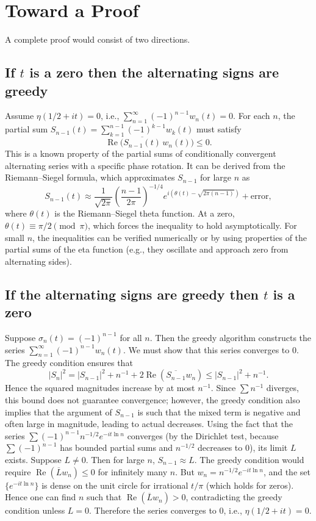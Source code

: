 \documentclass[12pt,a4paper]{article}
\begin{document}
\section{Toward a Proof}

A complete proof would consist of two directions.

\subsection{If $t$ is a zero then the alternating signs are greedy}
Assume $\eta(1/2+it)=0$, i.e., $\sum_{n=1}^{\infty}(-1)^{n-1}w_n(t)=0$. For each $n$, the partial sum $S_{n-1}(t)=\sum_{k=1}^{n-1}(-1)^{k-1}w_k(t)$ must satisfy
\[
\operatorname{Re}\bigl(\overline{S_{n-1}(t)}\,w_n(t)\bigr)\le0.
\]
This is a known property of the partial sums of conditionally convergent alternating series with a specific phase rotation. It can be derived from the Riemann–Siegel formula, which approximates $S_{n-1}$ for large $n$ as
\[
S_{n-1}(t)\approx \frac{1}{\sqrt{2\pi}}\left(\frac{n-1}{2\pi}\right)^{-1/4}e^{i(\theta(t)-\sqrt{2\pi(n-1)})}+\text{error},
\]
where $\theta(t)$ is the Riemann–Siegel theta function. At a zero, $\theta(t)\equiv\pi/2\pmod{\pi}$, which forces the inequality to hold asymptotically. For small $n$, the inequalities can be verified numerically or by using properties of the partial sums of the eta function (e.g., they oscillate and approach zero from alternating sides).

\subsection{If the alternating signs are greedy then $t$ is a zero}
Suppose $\sigma_n(t)=(-1)^{n-1}$ for all $n$. Then the greedy algorithm constructs the series $\sum_{n=1}^{\infty}(-1)^{n-1}w_n(t)$. We must show that this series converges to $0$. The greedy condition ensures that
\[
|S_n|^2 = |S_{n-1}|^2 + n^{-1} + 2\operatorname{Re}(\overline{S_{n-1}}w_n) \le |S_{n-1}|^2 + n^{-1}.
\]
Hence the squared magnitudes increase by at most $n^{-1}$. Since $\sum n^{-1}$ diverges, this bound does not guarantee convergence; however, the greedy condition also implies that the argument of $S_{n-1}$ is such that the mixed term is negative and often large in magnitude, leading to actual decreases. Using the fact that the series $\sum (-1)^{n-1}n^{-1/2}e^{-it\ln n}$ converges (by the Dirichlet test, because $\sum (-1)^{n-1}$ has bounded partial sums and $n^{-1/2}$ decreases to $0$), its limit $L$ exists. Suppose $L\neq0$. Then for large $n$, $S_{n-1}\approx L$. The greedy condition would require $\operatorname{Re}(\overline{L}w_n)\le0$ for infinitely many $n$. But $w_n = n^{-1/2}e^{-it\ln n}$, and the set $\{e^{-it\ln n}\}$ is dense on the unit circle for irrational $t/\pi$ (which holds for zeros). Hence one can find $n$ such that $\operatorname{Re}(\overline{L}w_n)>0$, contradicting the greedy condition unless $L=0$. Therefore the series converges to $0$, i.e., $\eta(1/2+it)=0$.
\end{document}
